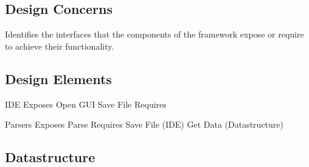 \documentclass[letterpaper,10pt,titlepage,draftclsnofoot,onecolumn,onesided] {IEEEtran}
\begin{document}
\subsection{Design Concerns}
Identifies the interfaces that the components of the framework expose or require to achieve their
functionality. 
\subsection{Design Elements}


	IDE
		Exposes
			Open GUI
			Save File
		Requires
	
	Parsers
		Exposes
			Parse 
		Requires
			Save File (IDE)
			Get Data (Datastructure)
	
\subsection{Datastructure}
\end{document}
